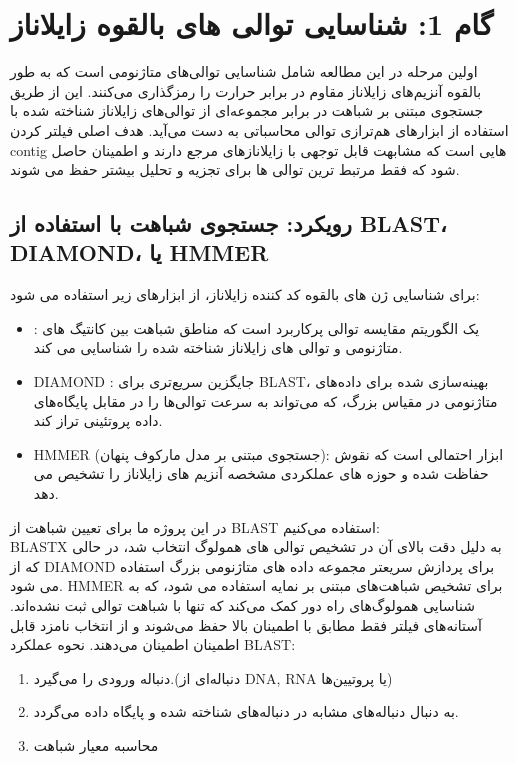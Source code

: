 \chapter{گام 1: شناسایی توالی های بالقوه زایلاناز}
    اولین مرحله در این مطالعه شامل شناسایی توالی‌های متاژنومی است که به طور بالقوه آنزیم‌های زایلاناز مقاوم در برابر حرارت را رمزگذاری می‌کنند. این از طریق جستجوی مبتنی بر شباهت در برابر مجموعه‌ای از توالی‌های زایلاناز شناخته شده با استفاده از ابزارهای هم‌ترازی توالی محاسباتی به دست می‌آید. هدف اصلی فیلتر کردن contig هایی است که مشابهت قابل توجهی با زایلانازهای مرجع دارند و اطمینان حاصل شود که فقط مرتبط ترین توالی ها برای تجزیه و تحلیل بیشتر حفظ می شوند.

    \section*{رویکرد: جستجوی شباهت با استفاده از BLAST، DIAMOND، یا HMMER}
        برای شناسایی ژن های بالقوه کد کننده زایلاناز، از ابزارهای زیر استفاده می شود:
        \begin{itemize}
            \item {}: 
            یک الگوریتم مقایسه توالی پرکاربرد است که مناطق شباهت بین کانتیگ های متاژنومی و توالی های زایلاناز شناخته شده را شناسایی می کند.
            \item DIAMOND : جایگزین سریع‌تری برای BLAST، بهینه‌سازی شده برای داده‌های متاژنومی در مقیاس بزرگ، که می‌تواند به سرعت توالی‌ها را در مقابل پایگاه‌های داده پروتئینی تراز کند.
            \item HMMER (جستجوی مبتنی بر مدل مارکوف پنهان): ابزار احتمالی است که نقوش حفاظت شده و حوزه های عملکردی مشخصه آنزیم های زایلاناز را تشخیص می دهد.
        \end{itemize}

    {\Large در این پروژه ما برای تعیین شباهت از ‌BLAST استفاده می‌کنیم:}\\
    BLASTX به دلیل دقت بالای آن در تشخیص توالی های همولوگ انتخاب شد، در حالی که از DIAMOND برای پردازش سریعتر مجموعه داده های متاژنومی بزرگ استفاده می شود. HMMER برای تشخیص شباهت‌های مبتنی بر نمایه استفاده می شود، که به شناسایی همولوگ‌های راه دور کمک می‌کند که تنها با شباهت توالی ثبت نشده‌اند. آستانه‌های فیلتر فقط مطابق با اطمینان بالا حفظ می‌شوند و از انتخاب نامزد قابل اطمینان اطمینان می‌دهند.
    نحوه عملکرد BLAST:
    \begin{enumerate}
        \item دنباله ورودی را می‌گیرد.(دنباله‌ای از DNA, RNA یا پروتیین‌‌ها)
        \item به دنبال دنباله‌‌های مشابه در دنباله‌های شناخته شده و پایگاه داده می‌گردد.
        \item محاسبه معیار شباهت
    \end{enumerate}

